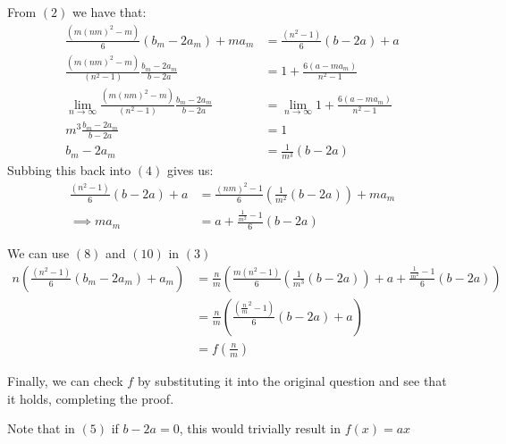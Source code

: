 \documentclass{article}
\begin{document}
\begin{enumerate}[1.]
From $(2)$ we have that:
\begin{align}
\frac{(m(nm)^2-m)}{6}(b_m-2a_m)+ma_m &= \frac{(n^2-1)}{6}(b-2a)+a
\\\frac{(m(nm)^2-m)}{(n^2-1)}\frac{b_m-2a_m}{b-2a} &= 1 + \frac{6(a-ma_m)}{n^2-1}
\\\lim_{n\to\infty}\frac{(m(nm)^2-m)}{(n^2-1)}\frac{b_m-2a_m}{b-2a} &= \lim_{n\to\infty} 1 + \frac{6(a-ma_m)}{n^2-1}
\\m^3 \frac{b_m-2a_m}{b-2a} &= 1 
\\ b_m-2a_m &= \frac{1}{m^3}(b-2a) 
\end{align}
Subbing this back into $(4)$ gives us:
\begin{align}
\frac{(n^2-1)}{6}(b-2a)+a &= \frac{(nm)^2-1}{6}(\frac{1}{m^2}(b-2a))+ma_m
\\\implies ma_m &= a + \frac{\frac{1}{m^2}-1}{6}(b-2a)
\end{align}

We can use $(8)$ and $(10)$ in $(3)$
\begin{align}
 n(\frac{(n^2-1)}{6}(b_m-2a_m)+a_m) &= \frac{n}{m}(\frac{m(n^2-1)}{6}(\frac{1}{m^3}(b-2a))+a + \frac{\frac{1}{m^2}-1}{6}(b-2a))
\\ &= \frac{n}{m}(\frac{(\frac{n}{m}^2-1)}{6}(b-2a)+a)
\\ &= f(\frac{n}{m})
\end{align}

Finally, we can check $f$ by substituting it into the original question and see that it holds, completing the proof.

Note that in $(5)$ if $b-2a = 0$, this would trivially result in $f(x) = ax$

\end{enumerate}
\end{document}
